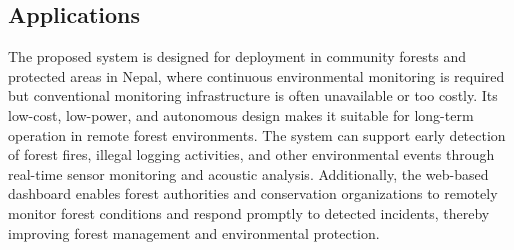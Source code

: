 \subsection{Applications}
The proposed system is designed for deployment in community forests and protected areas in Nepal, where continuous environmental monitoring is required but conventional monitoring infrastructure is often unavailable or too costly. Its low-cost, low-power, and autonomous design makes it suitable for long-term operation in remote forest environments. The system can support early detection of forest fires, illegal logging activities, and other environmental events through real-time sensor monitoring and acoustic analysis. Additionally, the web-based dashboard enables forest authorities and conservation organizations to remotely monitor forest conditions and respond promptly to detected incidents, thereby improving forest management and environmental protection.


\clearpage
